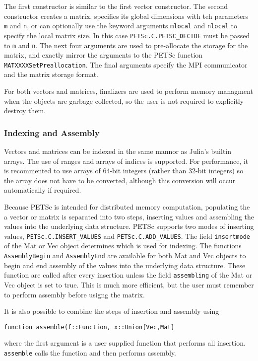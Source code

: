 \documentclass{article}
\newcommand{\ttt}{\texttt}
\begin{document}
The first constructor is similar to the first vector constructor.
The second constructor creates a matrix, specifies its global dimensions with teh parameters \ttt{m} and \ttt{n}, or can optionally use the keyword arguments \ttt{mlocal} and \ttt{nlocal} to specify the local matrix size.
In this case \ttt{PETSc.C.PETSC\_DECIDE} must be passed to \ttt{m} and \ttt{n}.
The next four arguments are used to pre-allocate the storage for the matrix, and exactly mirror the arguments to the PETSc function \ttt{MATXXXXSetPreallocation}.
The final arguments specify the MPI communicator and the matrix storage format.

For both vectors and matrices, finalizers are used to perform memory managment when the objects are garbage collected, so the user is not required to explicitly destroy them.

\subsubsection{Indexing and Assembly}
Vectors and matrices can be indexed in the same mannor as Julia's builtin arrays.
The use of ranges and arrays of indices is supported.
For performance, it is recommented to use arrays of 64-bit integers (rather than 32-bit integers) so the array does not have to be converted, although this conversion will occur automatically if required.

Because PETSc is intended for distributed memory computation, populating the a vector or matrix is separated into two steps, inserting values and assembling the values into the underlying data structure.
PETSc supports two modes of inserting values, \ttt{PETSc.C.INSERT\_VALUES} and \ttt{PETSc.C.ADD\_VALUES}.
The field \ttt{insertmode} of the Mat or Vec object  determines which is used for indexing.
The functions \ttt{AssemblyBegin} and \ttt{AssemblyEnd} are available for both Mat and Vec objects to begin and end assembly of the values into the underlying data structure.
These function are called after every insertion unless the field \ttt{assembling} of the Mat or Vec object is set to true.
This is much more efficient, but the user must remember to perform assembly before usigng the matrix.

It is also possible to combine the steps of insertion and assembly using
\begin{verbatim}
function assemble(f::Function, x::Union{Vec,Mat}
\end{verbatim}
where the first argument is a user supplied function that performs all insertion.
\ttt{assemble} calls the function and then performs assembly.
\end{document}
